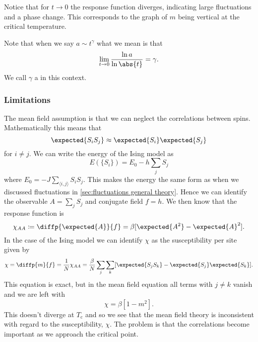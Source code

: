 \documentclass[fleqn]{NotesClass}
\begin{document}
    Notice that for \(t \to 0\) the response function diverges, indicating large fluctuations and a phase change.
    This corresponds to the graph of \(m\) being vertical at the critical temperature.
    
    Note that when we say \(a \sim t^{\gamma}\) what we mean is that
    \begin{equation}
        \lim_{t \to 0} \frac{\ln a}{\ln \abs{t}} = \gamma.
    \end{equation}
    We call \(\gamma\) a  in this context.
    
    \subsubsection{Limitations}
    The mean field assumption is that we can neglect the correlations between spins.
    Mathematically this means that
    \begin{equation}
        \expected{S_iS_j} \approx \expected{S_i}\expected{S_j}
    \end{equation}
    for \(i \ne j\).
    We can write the energy of the Ising model as
    \begin{equation}
        E(\{S_i\}) = E_0 - h\sum_j S_j
    \end{equation}
    where \(E_0 = -J \sum_{\langle i, j \rangle} S_iS_j\).
    This makes the energy the same form as when we discussed fluctuations in \cref{sec:fluctuations general theory}.
    Hence we can identify the observable \(A = \sum_j S_j\) and conjugate field \(f = h\).
    We then know that the response function is
    \begin{equation}
        \chi_{AA} \coloneqq \diffp{\expected{A}}{f} = \beta[\expected{A^2} - \expected{A}^2].
    \end{equation}
    In the case of the Ising model we can identify \(\chi\) as the susceptibility per site given by
    \begin{equation}
        \chi = \diffp{m}{f} = \frac{1}{N}\chi_{AA} = \frac{\beta}{N} \sum_{j} \sum_{k} [\expected{S_jS_k} - \expected{S_j}\expected{S_k}].
    \end{equation}
    This equation is exact, but in the mean field equation all terms with \(j \ne k\) vanish and we are left with
    \begin{equation}
        \chi = \beta[1 - m^2].
    \end{equation}
    This doesn't diverge at \(T_{\mathrm{c}}\) and so we see that the mean field theory is inconsistent with regard to the susceptibility, \(\chi\).
    The problem is that the correlations become important as we approach the critical point.
    
\end{document}
